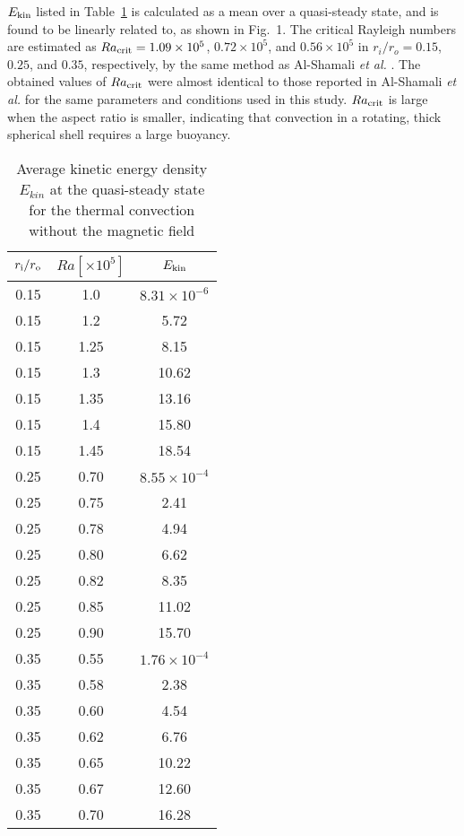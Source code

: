 $E_{\rm kin}$ listed in Table~\ref{table:Rac} is calculated as a mean over a quasi-steady state, and is found to be linearly related to, as shown in Fig.~1.
The critical Rayleigh numbers are estimated as $Ra_{\rm crit} = 1.09 \times 10^5$, $0.72 \times 10^5$, and $0.56 \times 10^5$ in $r_i/r_o = 0.15$, $0.25$, and $0.35$, respectively, by the same method as Al-Shamali {\it et al.} . 
The obtained values of $Ra_{\rm crit}$ were almost identical to those reported in Al-Shamali {\it et al.}  for the same parameters and conditions used in this study. 
$Ra_{\rm crit}$ is large when the aspect ratio is smaller, indicating that convection in a rotating, thick spherical shell requires a large buoyancy.
%
%
\begin{table}
\caption{Average kinetic energy density $E_{kin}$ at the quasi-steady state \\
for the thermal convection without the magnetic field}
\begin{center}
\begin{tabular}{|ccc||}
   \hline
  $r_{\rm i}/r_{\rm o}$ & $Ra[\times 10^5] $ &  $E_{\rm kin}$ \\
    \hline \hline
 0.15  &  1.0  &  $8.31 \times 10^{-6}$ \\
 0.15  &  1.2  &  5.72 \\
 0.15  &  1.25 &  8.15 \\
 0.15  &  1.3  &  10.62 \\
 0.15  &  1.35 &  13.16 \\
 0.15  &  1.4  &  15.80 \\
 0.15  &  1.45  &  18.54 \\
 \hline
%
 0.25  &  0.70 &  $8.55 \times 10^{-4}$ \\
 0.25  &  0.75 &  2.41 \\
 0.25  &  0.78  &  4.94 \\
 0.25  &  0.80  &  6.62 \\
 0.25  &  0.82  & 8.35 \\
 0.25  &  0.85  &  11.02 \\
 0.25  &  0.90  &  15.70 \\
 \hline
%
 0.35  &  0.55  &  $1.76 \times 10^{-4}$ \\
 0.35  &  0.58  &  2.38  \\
 0.35  &  0.60  &  4.54  \\
 0.35  &  0.62  &  6.76 \\
 0.35  &  0.65  &  10.22 \\
 0.35  &  0.67  &  12.60\\
 0.35  &  0.70  &  16.28 \\
 \hline
 \hline
\end{tabular}
\end{center}
\label{table:Rac}
\end{table}
%
